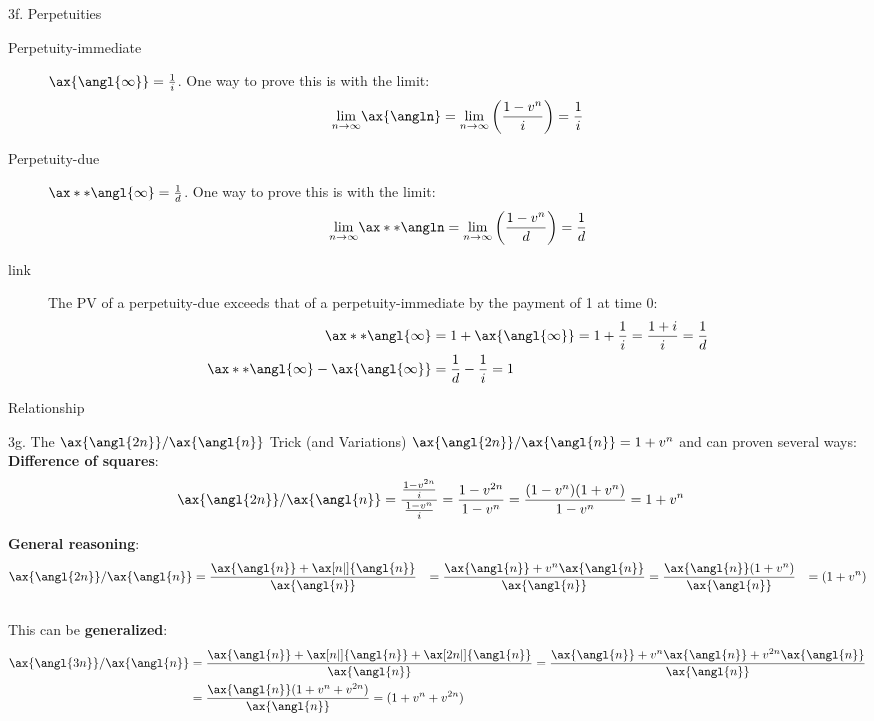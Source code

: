 \begin{CHPT_SUMM_AUTO}[label = {L.-3f}]{3f. Perpetuities}
\begin{description}
	\item[Perpetuity-immediate]	$\ax{\angl{\infty}}	=	\frac{1}{i}$.
		One way to prove this is with the limit:
		\begin{align*}
		\underset{n \rightarrow \infty}{\lim} \ax{\angln}
		=	\underset{n \rightarrow \infty}{\lim} \left( \frac{1 - v^{n}}{i} \right)
		=	\frac{1}{i}
		\end{align*}
	\item[Perpetuity-due]	$\ax**{\angl{\infty}}	=	\frac{1}{d}$.
		One way to prove this is with the limit:
		\begin{align*}
		\underset{n \rightarrow \infty}{\lim} \ax**{\angln}
		=	\underset{n \rightarrow \infty}{\lim} \left( \frac{1 - v^{n}}{d} \right)
		=	\frac{1}{d}
		\end{align*}
	\item[link]		The PV of a perpetuity-due exceeds that of a perpetuity-immediate by the payment of 1 at time 0: 
		\begin{align*}
		\ax**{\angl{\infty}}	
		&=	1 + \ax{\angl{\infty}}	
		= 	1 + \frac{1}{i} 
		= 	\frac{1 + i}{i} 
		= 	\frac{1}{d}				\\
		\ax**{\angl{\infty}}	 - \ax{\angl{\infty}}	
		&=	\frac{1}{d} - \frac{1}{i} 
		=	1
		\end{align*}
	\item[Relationship]	
\end{description}
\end{CHPT_SUMM_AUTO}

\begin{CHPT_SUMM_AUTO}[label = {L.-3g}]{3g. The $\ax{\angl{2n}} / \ax{\angl{n}}$ Trick (and Variations)}
$\ax{\angl{2n}} / \ax{\angl{n}} = 1 + v^{n}$ and can proven several ways:\\

\textbf{Difference of squares}:
\begin{align*}
	\ax{\angl{2n}} / \ax{\angl{n}}
	&=	\frac{\frac{1 - v^{2n}}{i}}{\frac{1 - v^{n}}{i}}
	=	\frac{1 - v^{2n}}{1 - v^{n}}
	=	\frac{(1 - v^{n})(1 + v^{n})}{1 - v^{n}}
	=	1 + v^{n}
\end{align*}

\textbf{General reasoning}:
\begin{align*}
	\ax{\angl{2n}} / \ax{\angl{n}}
	&=	\frac{\ax{\angl{n}} + \ax[n|]{\angl{n}}}{\ax{\angl{n}}}
	&=	\frac{\ax{\angl{n}} + v^{n} \ax{\angl{n}}}{\ax{\angl{n}}}
	&=	\frac{\ax{\angl{n}}(1 + v^{n})}{\ax{\angl{n}}}
	&=	(1 + v^{n})
\end{align*}\\

This can be \textbf{generalized}:
\begin{align*}
	\ax{\angl{3n}} / \ax{\angl{n}}
	&=	\frac{\ax{\angl{n}} + \ax[n|]{\angl{n}} + \ax[2n|]{\angl{n}}}{\ax{\angl{n}}}
	=	\frac{\ax{\angl{n}} + v^{n} \ax{\angl{n}} + v^{2n} \ax{\angl{n}}}{\ax{\angl{n}}}	\\
	&=	\frac{\ax{\angl{n}}(1 + v^{n} + v^{2n})}{\ax{\angl{n}}}
	=	(1 + v^{n} + v^{2n})
\end{align*}
\end{CHPT_SUMM_AUTO}

